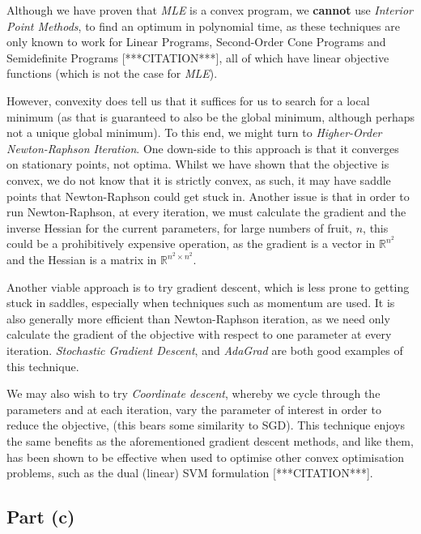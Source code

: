 Although we have proven that \textit{MLE} is a convex program, we \textbf{cannot} use \textit{Interior Point Methods}, to find an optimum in polynomial time, as these techniques are only known to work for Linear Programs, Second-Order Cone Programs and Semidefinite Programs [***CITATION***], all of which have linear objective functions (which is not the case for \textit{MLE}).

However, convexity does tell us that it suffices for us to search for a local minimum (as that is guaranteed to also be the global minimum, although perhaps not a unique global minimum). To this end, we might turn to \textit{Higher-Order Newton-Raphson Iteration}. One down-side to this approach is that it converges on stationary points, not optima. Whilst we have shown that the objective is convex, we do not know that it is strictly convex, as such, it may have saddle points that Newton-Raphson could get stuck in. Another issue is that in order to run Newton-Raphson, at every iteration, we must calculate the gradient and the inverse Hessian for the current parameters, for large numbers of fruit, $n$, this could be a prohibitively expensive operation, as the gradient is a vector in $\mathbb{R}^{n^2}$ and the Hessian is a matrix in $\mathbb{R}^{n^2\times n^2}$.

Another viable approach is to try gradient descent, which is less prone to getting stuck in saddles, especially when techniques such as momentum are used. It is also generally more efficient than Newton-Raphson iteration, as we need only calculate the gradient of the objective with respect to one parameter at every iteration. \textit{Stochastic Gradient Descent}, and \textit{AdaGrad} are both good examples of this technique.

We may also wish to try \textit{Coordinate descent}, whereby we cycle through the parameters and at each iteration, vary the parameter of interest in order to reduce the objective, (this bears some similarity to SGD). This technique enjoys the same benefits as the aforementioned gradient descent methods, and like them, has been shown to be effective when used to optimise other convex optimisation problems, such as the dual (linear) SVM formulation [***CITATION***].

\subsection{Part (c)}
